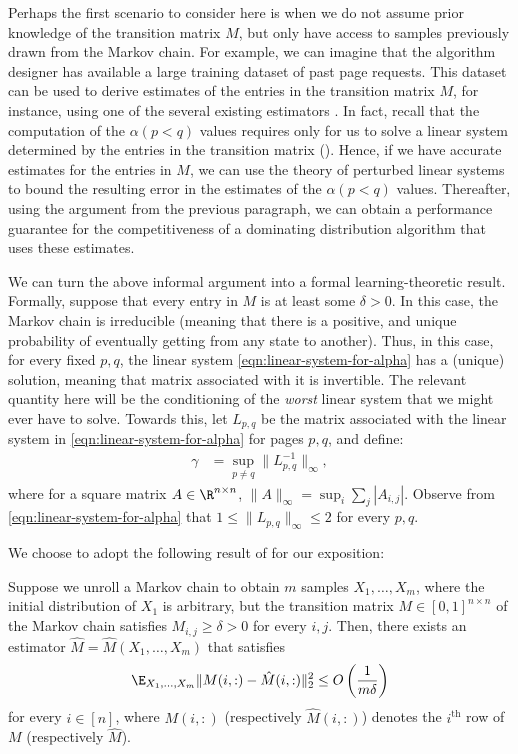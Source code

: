 \documentclass[11pt]{article}
\begin{document}
Perhaps the first scenario to consider here is when we do not assume prior knowledge of the transition matrix $M$, but only have access to samples previously drawn from the Markov chain. For example, we can imagine that the algorithm designer has available a large training dataset of past page requests. This dataset can be used to derive estimates of the entries in the transition matrix $M$, for instance, using one of the several existing estimators \citep{hao2018learning, wolfer2021statistical, huang2024non}. In fact, recall that the computation of the $\alpha(p<q)$ values requires only for us to solve a linear system determined by the entries in the transition matrix (). Hence, if we have accurate estimates for the entries in $M$, we can use the theory of perturbed linear systems to bound the resulting error in the estimates of the $\alpha(p<q)$ values. Thereafter, using the argument from the previous paragraph, we can obtain a performance guarantee for the competitiveness of a dominating distribution algorithm that uses these estimates.

We can turn the above informal argument into a formal learning-theoretic result. Formally, suppose that every entry in $M$ is at least some $\delta > 0$. In this case, the Markov chain is irreducible (meaning that there is a positive, and unique probability of eventually getting from any state to another). Thus, in this case, for every fixed $p,q$, the linear system \eqref{eqn:linear-system-for-alpha} has a (unique) solution, meaning that matrix associated with it is invertible. The relevant quantity here will be the conditioning of the \textit{worst} linear system that we might ever have to solve. Towards this, let $L_{p,q}$ be the matrix associated with the linear system in \eqref{eqn:linear-system-for-alpha} for pages $p,q$, and define:
\begin{align}
    \label{eqn:gamma-def}
    \gamma &= \sup_{p \neq q} \|L_{p,q}^{-1}\|_\infty,
\end{align}
where for a square matrix $A \in \R^{n \times n}$, $\|A\|_\infty = \sup_i \sum_{j}|A_{i,j}|$. Observe from \eqref{eqn:linear-system-for-alpha} that $1 \le \|L_{p,q}\|_\infty \le 2$ for every $p,q$.

We choose to adopt the following result of \cite{hao2018learning} for our exposition:

\begin{theorem}
    \label{thm:learning-markov-chains}
    Suppose we unroll a Markov chain to obtain $m$ samples $X_1,\dots,X_m$, where the initial distribution of $X_1$ is arbitrary, but the transition matrix $M \in [0,1]^{n \times n}$ of the Markov chain satisfies $M_{i,j} \ge \delta > 0$ for every $i,j$. Then, there exists an estimator $\hat{M}=\hat{M}(X_1,\dots,X_m)$ that satisfies
    \begin{align*}
        \E_{X_1,\dots,X_m}\|M(i,:) - \hat{M}(i,:)\|_2^2 \le O \left(\frac{1}{m\delta}\right)
    \end{align*}
    for every $i \in [n]$, where $M(i,:)$ (respectively $\hat{M}(i,:)$) denotes the $i^\text{th}$ row of $M$ (respectively $\hat{M}$).
\end{theorem}
\end{document}
